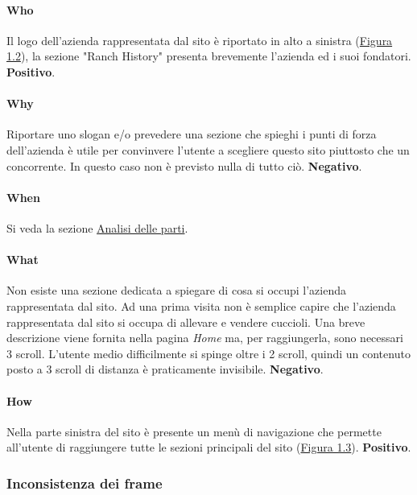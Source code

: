 \documentclass[../rapporto-usabilita.tex]{subfiles}
\begin{document}
			\paragraph{Who}
				Il logo dell'azienda rappresentata dal sito è riportato in alto a sinistra (\hyperref[fig:homefocus]{Figura 1.2}), la sezione "Ranch History" presenta brevemente l'azienda ed i suoi fondatori. \textbf{Positivo}.
				
			\paragraph{Why}
			 	Riportare uno slogan e/o prevedere una sezione che spieghi i punti di forza dell'azienda è utile per convinvere l'utente a scegliere questo sito piuttosto che un concorrente.
			 	In questo caso non è previsto nulla di tutto ciò. \textbf{Negativo}. 
				
			\paragraph{When}
				Si veda la sezione \hyperref[sec:analisiparti]{Analisi delle parti}. 
				
			\paragraph{What}
				Non esiste una sezione dedicata a spiegare di cosa si occupi l'azienda rappresentata dal sito.
				Ad una prima visita non è semplice capire che l'azienda rappresentata dal sito si occupa di allevare e vendere cuccioli.				
				 Una breve descrizione viene fornita nella pagina \textit{Home} ma, per raggiungerla, sono necessari 3 scroll. L'utente medio difficilmente si spinge oltre i 2 scroll, quindi un contenuto posto a 3 scroll di distanza è praticamente invisibile. \textbf{Negativo}. 
			
			\paragraph{How}
				Nella parte sinistra del sito è presente un menù di navigazione che permette all'utente di raggiungere tutte le sezioni principali del sito (\hyperref[fig:homefocus]{Figura 1.3}). \textbf{Positivo}.
		
		\subsubsection{Inconsistenza dei frame}
		
\end{document}
